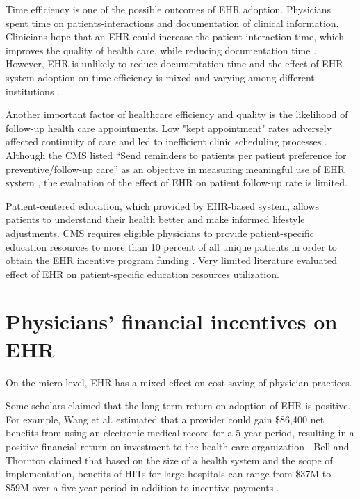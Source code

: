 \documentclass[12pt]{report}
\begin{document}
Time efficiency is one of the possible outcomes of EHR adoption. Physicians spent time on patients-interactions and documentation of clinical information. Clinicians hope that an EHR could increase the patient interaction time, which improves the quality of health care, while reducing documentation time \citep{leung2003incentives}. However, EHR is unlikely to reduce documentation time \citep{poissant2005impact} and the effect of EHR system adoption on time efficiency is mixed and varying among different institutions \citep{Chaudhry2006}.

Another important factor of healthcare efficiency and quality is the likelihood of follow-up health care appointments. Low "kept appointment" rates adversely affected continuity of care and led to inefficient clinic scheduling processes \citep{myers2001strategies}. Although the CMS listed ``Send reminders to patients per patient preference for preventive/follow-up care'' as an objective in measuring meaningful use of EHR system \citep{cmsincentive14}, the evaluation of the effect of EHR on patient follow-up rate is limited.

Patient-centered education, which provided by EHR-based system, allows patients to understand their health better and make informed lifestyle adjustments. CMS requires eligible physicians to provide patient-specific education resources to more than 10 percent of all unique patients in order to obtain the EHR incentive program funding \citep{healthit05}. Very limited literature evaluated effect of EHR on patient-specific education resources utilization. 

\section{Physicians' financial incentives on EHR}
On the micro level, EHR has a mixed effect on cost-saving of physician practices.

Some scholars claimed that the long-term return on adoption of EHR is positive. For example, Wang et al. estimated that a provider could gain \$86,400 net benefits from using an electronic medical record for a 5-year period, resulting in a positive financial return on investment to the health care organization \citep{Wang2003}. Bell and Thornton claimed that based on the size of a health system and the scope of implementation, benefits of HITs for large hospitals can range from \$37M to \$59M over a five-year period in addition to incentive payments \citep{Bell2011}.
\end{document}
